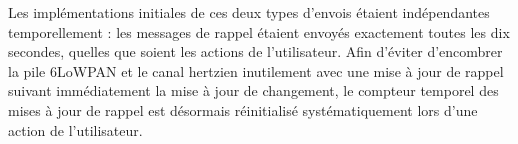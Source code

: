 Les implémentations initiales de ces deux types d’envois étaient indépendantes temporellement : les messages de rappel étaient envoyés exactement toutes les dix secondes, quelles que soient les actions de l’utilisateur.
Afin d’éviter d’encombrer la pile 6LoWPAN et le canal hertzien inutilement avec une mise à jour de rappel suivant immédiatement la mise à jour de changement, le compteur temporel des mises à jour de rappel est désormais réinitialisé systématiquement lors d’une action de l’utilisateur.
